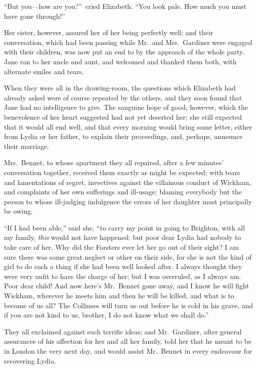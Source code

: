 \documentclass[12pt,english,oneside]{book}
\begin{document}
{}``But you\mbox{---}how are you?''\ cried Elizabeth. {}``You
look pale. How much you must have gone through!''\ 

Her sister, however, assured her of her being perfectly well; and
their conversation, which had been passing while Mr.\ and Mrs.\ Gardiner
were engaged with their children, was now put an end to by the approach
of the whole party. Jane ran to her uncle and aunt, and welcomed and
thanked them both, with alternate smiles and tears.

When they were all in the drawing-room, the questions which Elizabeth
had already asked were of course repeated by the others, and they
soon found that Jane had no intelligence to give. The sanguine hope
of good, however, which the benevolence of her heart suggested had
not yet deserted her; she still expected that it would all end well,
and that every morning would bring some letter, either from Lydia
or her father, to explain their proceedings, and, perhaps, announce
their marriage.

Mrs.\ Bennet, to whose apartment they all repaired, after a few minutes'
conversation together, received them exactly as might be expected;
with tears and lamentations of regret, invectives against the villainous
conduct of Wickham, and complaints of her own sufferings and ill-usage;
blaming everybody but the person to whose ill-judging indulgence the
errors of her daughter must principally be owing.

{}``If I had been able,'' said she, {}``to carry my point in going
to Brighton, with all my family, \textit{this} would not have happened;
but poor dear Lydia had nobody to take care of her. Why did the Forsters
ever let her go out of their sight? I am sure there was some great
neglect or other on their side, for she is not the kind of girl to
do such a thing if she had been well looked after. I always thought
they were very unfit to have the charge of her; but I was overruled,
as I always am. Poor dear child! And now here's Mr.\ Bennet gone
away, and I know he will fight Wickham, wherever he meets him and
then he will be killed, and what is to become of us all? The Collinses
will turn us out before he is cold in his grave, and if you are not
kind to us, brother, I do not know what we shall do.''

They all exclaimed against such terrific ideas; and Mr.\ Gardiner,
after general assurances of his affection for her and all her family,
told her that he meant to be in London the very next day, and would
assist Mr.\ Bennet in every endeavour for recovering Lydia.
\end{document}
